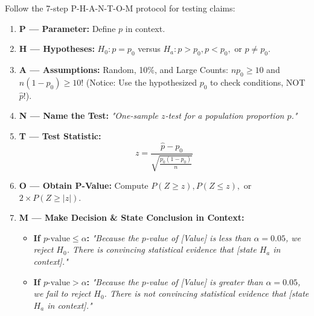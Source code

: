 \begin{lessonbox}
Follow the 7-step P-H-A-N-T-O-M protocol for testing claims:
\begin{enumerate}[leftmargin=1.5em]
  \item \textbf{P --- Parameter:} Define $p$ in context.
  \item \textbf{H --- Hypotheses:} $H_0: p = p_0$ versus $H_a: p > p_0, p < p_0,$ or $p \neq p_0$.
  \item \textbf{A --- Assumptions:} Random, 10\%, and Large Counts: $n p_0 \ge 10$ and $n(1-p_0) \ge 10$! (Notice: Use the hypothesized $p_0$ to check conditions, NOT $\hat{p}$!).
  \item \textbf{N --- Name the Test:} \textit{"One-sample $z$-test for a population proportion $p$."}
  \item \textbf{T --- Test Statistic:}
  \begin{equation}
    z = \frac{\hat{p} - p_0}{\sqrt{\frac{p_0(1-p_0)}{n}}}
  \end{equation}
  \item \textbf{O --- Obtain P-Value:} Compute $P(Z \ge z), P(Z \le z),$ or $2 \times P(Z \ge |z|)$.
  \item \textbf{M --- Make Decision & State Conclusion in Context:}
  \begin{itemize}
    \item \textbf{If $p\text{-value} \le \alpha$:} \textit{"Because the $p$-value of [Value] is less than $\alpha = 0.05$, we reject $H_0$. There is convincing statistical evidence that [state $H_a$ in context]."}
    \item \textbf{If $p\text{-value} > \alpha$:} \textit{"Because the $p$-value of [Value] is greater than $\alpha = 0.05$, we fail to reject $H_0$. There is not convincing statistical evidence that [state $H_a$ in context]."}
  \end{itemize}
\end{enumerate}
\end{lessonbox}

